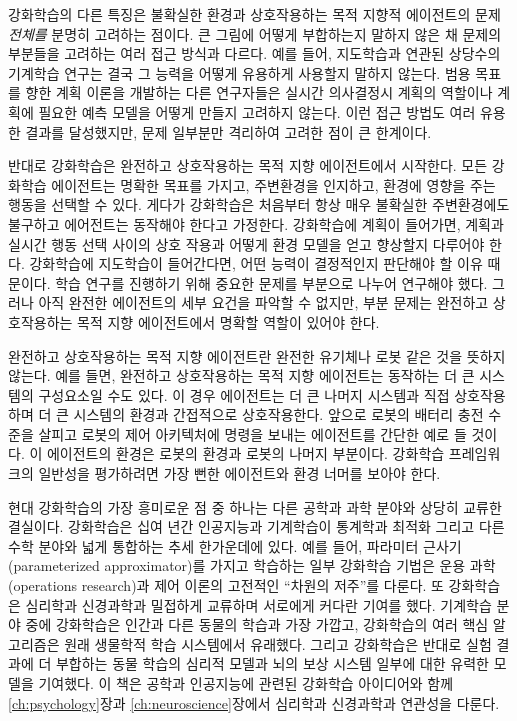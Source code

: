 강화학습의 다른 특징은 불확실한 환경과 상호작용하는 목적 지향적 에이전트의 문제
\emph{전체를} 분명히 고려하는 점이다. 큰 그림에 어떻게 부합하는지 말하지 않은 채
문제의 부분들을 고려하는 여러 접근 방식과 다르다. 예를 들어, 지도학습과 연관된
상당수의 기계학습 연구는 결국 그 능력을 어떻게 유용하게 사용할지 말하지 않는다.
범용 목표를 향한 계획 이론을 개발하는 다른 연구자들은 실시간 의사결정시 계획의
역할이나 계획에 필요한 예측 모델을 어떻게 만들지 고려하지 않는다. 이런 접근
방법도 여러 유용한 결과를 달성했지만, 문제 일부분만 격리하여 고려한 점이 큰
한계이다.


반대로 강화학습은 완전하고 상호작용하는 목적 지향 에이전트에서 시작한다. 모든
강화학습 에이전트는 명확한 목표를 가지고, 주변환경을 인지하고, 환경에 영향을
주는 행동을 선택할 수 있다. 게다가 강화학습은 처음부터 항상 매우 불확실한
주변환경에도 불구하고 에어전트는 동작해야 한다고 가정한다. 강화학습에 계획이
들어가면, 계획과 실시간 행동 선택 사이의 상호 작용과 어떻게 환경 모델을 얻고
향상할지 다루어야 한다. 강화학습에 지도학습이 들어간다면, 어떤 능력이 결정적인지
판단해야 할 이유 때문이다. 학습 연구를 진행하기 위해 중요한 문제를 부분으로
나누어 연구해야 했다. 그러나 아직 완전한 에이전트의 세부 요건을 파악할 수
없지만, 부분 문제는 완전하고 상호작용하는 목적 지향 에이전트에서 명확할 역할이
있어야 한다.

완전하고 상호작용하는 목적 지향 에이전트란 완전한 유기체나 로봇 같은 것을
뜻하지 않는다. 예를 들면, 완전하고 상호작용하는 목적 지향 에이전트는 동작하는 더
큰 시스템의 구성요소일 수도 있다. 이 경우 에이전트는 더 큰 나머지 시스템과 직접
상호작용하며 더 큰 시스템의 환경과 간접적으로 상호작용한다. 앞으로 로봇의 배터리
충전 수준을 살피고 로봇의 제어 아키텍처에 명령을 보내는 에이전트를 간단한 예로
들 것이다. 이 에이전트의 환경은 로봇의 환경과 로봇의 나머지 부분이다. 강화학습
프레임워크의 일반성을 평가하려면 가장 뻔한 에이전트와 환경 너머를 보아야 한다.

현대 강화학습의 가장 흥미로운 점 중 하나는 다른 공학과 과학 분야와 상당히 교류한
결실이다. 강화학습은 십여 년간 인공지능과 기계학습이 통계학과 최적화 그리고 다른
수학 분야와 넓게 통합하는 추세 한가운데에 있다. 예를 들어, 파라미터
근사기(parameterized approximator)를 가지고 학습하는 일부 강화학습 기법은 운용
과학(operations research)과 제어 이론의 고전적인 ``차원의 저주''를 다룬다. 또
강화학습은 심리학과 신경과학과 밀접하게 교류하며 서로에게 커다란 기여를 했다.
기계학습 분야 중에 강화학습은 인간과 다른 동물의 학습과 가장 가깝고, 강화학습의
여러 핵심 알고리즘은 원래 생물학적 학습 시스템에서 유래했다. 그리고 강화학습은
반대로 실험 결과에 더 부합하는 동물 학습의 심리적 모델과 뇌의 보상 시스템 일부에
대한 유력한 모델을 기여했다. 이 책은 공학과 인공지능에 관련된 강화학습
아이디어와 함께 \ref{ch:psychology}장과 \ref{ch:neuroscience}장에서 심리학과
신경과학과 연관성을 다룬다.

